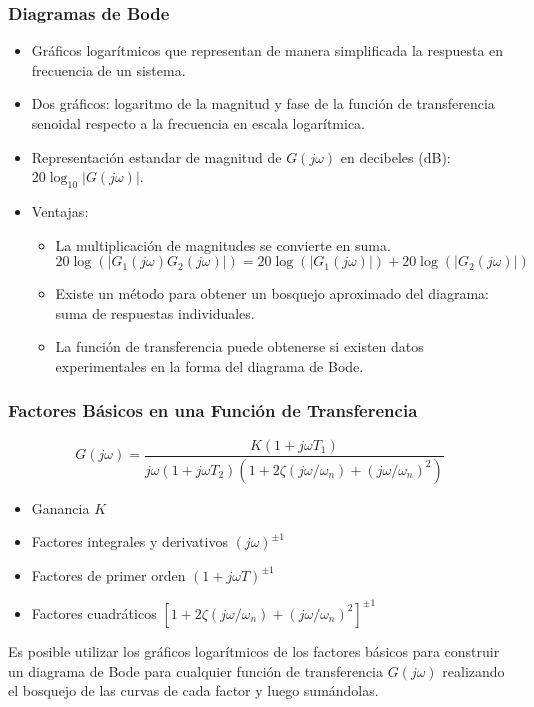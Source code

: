 \documentclass[aspectratio=169]{beamer}
\theoremstyle{definition}
\theoremstyle{plain}
\theoremstyle{remark}
\begin{document}
\begin{frame}[<+->]\frametitle{Diagramas de Bode}
	\begin{itemize}
		\item Gráficos logarítmicos que representan de manera simplificada la respuesta en frecuencia de un sistema.
		\item Dos gráficos: logaritmo de la magnitud y fase de la función de transferencia senoidal respecto a la frecuencia en escala logarítmica.
		\item Representación estandar de magnitud de $G(j\omega)$ en decibeles (dB): $20 \log_{10}|G(j\omega)|$.
		\item Ventajas:
		\begin{itemize}
			\item La multiplicación de magnitudes se convierte en suma.
			\begin{equation*}
				20 \log (|G_1(j\omega)G_2(j\omega)|) = 20 \log (|G_1(j\omega)|) + 20 \log (|G_2(j\omega)|)
			\end{equation*}
			\item Existe un método para obtener un bosquejo aproximado del diagrama: suma de respuestas individuales.
			\item La función de transferencia puede obtenerse si existen datos experimentales en la forma del diagrama de Bode.
		\end{itemize}
	\end{itemize}
\end{frame}

\begin{frame}[<+->]\frametitle{Factores Básicos en una Función de Transferencia}
	\begin{equation*}
		G(j\omega) = \frac{K(1+j\omega T_1)}{j\omega(1 + j\omega T_2)(1 + 2\zeta(j\omega/\omega_n)+(j\omega/\omega_n)^2)}
	\end{equation*}
	\pause
	\begin{itemize}
		\item Ganancia $K$
		\item Factores integrales y derivativos $(j\omega)^{\pm 1}$
		\item Factores de primer orden $(1 + j\omega T)^{\pm 1}$
		\item Factores cuadráticos $[1 + 2\zeta(j\omega/\omega_n)+(j\omega/\omega_n)^2]^{\pm 1}$
	\end{itemize}
	\pause
	Es posible utilizar los gráficos logarítmicos de los factores básicos para construir un diagrama de Bode para cualquier función de transferencia $G(j\omega)$ realizando el bosquejo de las curvas de cada factor y luego sumándolas.
\end{frame}
\end{document}
